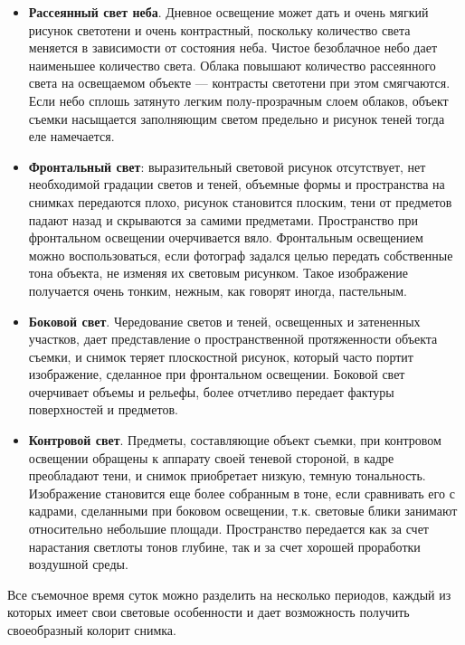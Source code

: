 \documentclass{article}
\newcommand{\important}[1]{\textbf{#1}}
\begin{document}
\begin{itemize}
	\item \important{Рассеянный свет неба}. Дневное освещение может дать и очень мягкий рисунок светотени и очень контрастный, поскольку количество света меняется в зависимости от состояния неба. Чистое безоблачное небо дает наименьшее количество света. Облака повышают количество рассеянного света на освещаемом объекте --- контрасты светотени при этом смягчаются. Если небо сплошь затянуто легким полу-прозрачным слоем облаков, объект съемки насыщается заполняющим светом предельно и рисунок теней тогда еле намечается.
	\item \important{Фронтальный свет}: выразительный световой рисунок отсутствует, нет необходимой градации светов и теней, объемные формы и пространства на снимках передаются плохо, рисунок становится плоским, тени от предметов падают назад и скрываются за самими предметами. Пространство при фронтальном освещении очерчивается вяло. Фронтальным освещением можно воспользоваться, если фотограф задался целью передать собственные тона объекта, не изменяя их световым рисунком. Такое изображение получается очень тонким, нежным, как говорят иногда, пастельным.
	\item \important{Боковой свет}. Чередование светов и теней, освещенных и затененных участков, дает представление о пространственной протяженности объекта съемки, и снимок теряет плоскостной рисунок, который часто портит изображение, сделанное при фронтальном освещении. Боковой свет очерчивает объемы и рельефы, более отчетливо передает фактуры поверхностей и предметов.
	\item \important{Контровой свет}. Предметы, составляющие объект съемки, при контровом освещении обращены к аппарату своей теневой стороной, в кадре преобладают тени, и снимок приобретает низкую, темную тональность. Изображение становится еще более собранным в тоне, если сравнивать его с кадрами, сделанными при боковом освещении, т.к. световые блики занимают относительно небольшие площади. Пространство передается как за счет нарастания светлоты тонов глубине, так и за счет хорошей проработки воздушной среды.
\end{itemize}
Все съемочное время суток можно разделить на несколько периодов, каждый из которых имеет свои световые особенности и дает возможность получить своеобразный колорит снимка.
\end{document}

